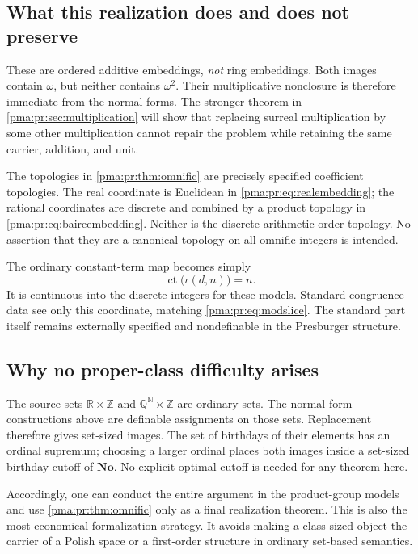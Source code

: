 \documentclass[11pt]{article}
\numberwithin{equation}{section}
\theoremstyle{definition}
\theoremstyle{remark}
\newcommand{\N}{\mathbb N}
\newcommand{\Z}{\mathbb Z}
\newcommand{\Q}{\mathbb Q}
\newcommand{\R}{\mathbb R}
\newcommand{\No}{\mathbf{No}}
\newcommand{\ct}{\operatorname{ct}}
\begin{document}
\subsection{What this realization does and does not preserve}

These are ordered additive embeddings, \emph{not} ring embeddings. Both
images contain $\omega$, but neither contains $\omega^2$. Their
multiplicative nonclosure is therefore immediate from the normal forms.
The stronger theorem in \cref{pma:pr:sec:multiplication} will show that replacing
surreal multiplication by some other multiplication cannot repair the
problem while retaining the same carrier, addition, and unit.

The topologies in \cref{pma:pr:thm:omnific} are precisely specified coefficient
topologies. The real coordinate is Euclidean in
\eqref{pma:pr:eq:realembedding}; the rational coordinates are discrete and
combined by a product topology in \eqref{pma:pr:eq:baireembedding}. Neither is
the discrete arithmetic order topology. No assertion that they are a
canonical topology on all omnific integers is intended.

The ordinary constant-term map becomes simply
\[
 \ct\bigl(\iota(d,n)\bigr)=n.
\]
It is continuous into the discrete integers for these models. Standard
congruence data see only this coordinate, matching
\eqref{pma:pr:eq:modslice}. The standard part itself remains externally
specified and nondefinable in the Presburger structure.

\subsection{Why no proper-class difficulty arises}

The source sets $\R\times\Z$ and $\Q^{\N}\times\Z$ are ordinary sets.
The normal-form constructions above are definable assignments on those
sets. Replacement therefore gives set-sized images. The set of birthdays
of their elements has an ordinal supremum; choosing a larger ordinal
places both images inside a set-sized birthday cutoff of $\No$.
No explicit optimal cutoff is needed for any theorem here.

Accordingly, one can conduct the entire argument in the product-group
models and use \cref{pma:pr:thm:omnific} only as a final realization theorem.
This is also the most economical formalization strategy. It avoids
making a class-sized object the carrier of a Polish space or a
first-order structure in ordinary set-based semantics.
\end{document}
